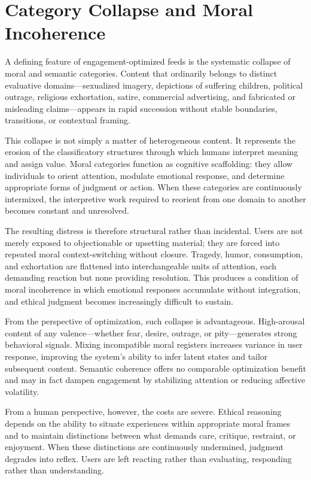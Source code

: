\documentclass[12pt]{article}
\begin{document}
\section{Category Collapse and Moral Incoherence}

A defining feature of engagement-optimized feeds is the systematic collapse of moral and semantic categories. Content that ordinarily belongs to distinct evaluative domains—sexualized imagery, depictions of suffering children, political outrage, religious exhortation, satire, commercial advertising, and fabricated or misleading claims—appears in rapid succession without stable boundaries, transitions, or contextual framing.

This collapse is not simply a matter of heterogeneous content. It represents the erosion of the classificatory structures through which humans interpret meaning and assign value. Moral categories function as cognitive scaffolding: they allow individuals to orient attention, modulate emotional response, and determine appropriate forms of judgment or action. When these categories are continuously intermixed, the interpretive work required to reorient from one domain to another becomes constant and unresolved.

The resulting distress is therefore structural rather than incidental. Users are not merely exposed to objectionable or upsetting material; they are forced into repeated moral context-switching without closure. Tragedy, humor, consumption, and exhortation are flattened into interchangeable units of attention, each demanding reaction but none providing resolution. This produces a condition of moral incoherence in which emotional responses accumulate without integration, and ethical judgment becomes increasingly difficult to sustain.

From the perspective of optimization, such collapse is advantageous. High-arousal content of any valence—whether fear, desire, outrage, or pity—generates strong behavioral signals. Mixing incompatible moral registers increases variance in user response, improving the system’s ability to infer latent states and tailor subsequent content. Semantic coherence offers no comparable optimization benefit and may in fact dampen engagement by stabilizing attention or reducing affective volatility.

From a human perspective, however, the costs are severe. Ethical reasoning depends on the ability to situate experiences within appropriate moral frames and to maintain distinctions between what demands care, critique, restraint, or enjoyment. When these distinctions are continuously undermined, judgment degrades into reflex. Users are left reacting rather than evaluating, responding rather than understanding.
\end{document}
